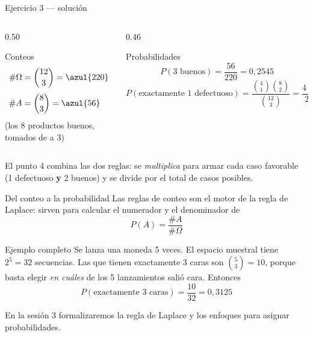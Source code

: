 \documentclass[aspectratio=169,10pt]{beamer}
\begin{document}
\begin{frame}{Ejercicio 3 — solución}
  \begin{columns}[T,onlytextwidth]
    \begin{column}{0.50\textwidth}
      \begin{block}{Conteos}
        \small
        \begin{align*}
          \#\Omega &= \binom{12}{3} = \azul{220}\\[0.3em]
          \#A &= \binom{8}{3} = \azul{56}
        \end{align*}
        \footnotesize
        (los 8 productos buenos, tomados de a 3)
      \end{block}
    \end{column}
    \begin{column}{0.46\textwidth}
      \begin{exampleblock}{Probabilidades}
        \footnotesize
        \[ P(\text{3 buenos})=\frac{56}{220}=0{,}2545 \]
        \[ P(\text{exactamente 1 defectuoso})
           =\frac{\binom{4}{1}\binom{8}{2}}{\binom{12}{3}}
           =\frac{4\cdot 28}{220}=\frac{112}{220}=0{,}5091 \]
      \end{exampleblock}
    \end{column}
  \end{columns}

  \vspace{0.1cm}
  {\footnotesize\color{uniGris} El punto 4 combina las dos reglas: se
  \emph{multiplica} para armar cada caso favorable (1 defectuoso \textbf{y} 2
  buenos) y se divide por el total de casos posibles.}
\end{frame}

\begin{frame}{Del conteo a la probabilidad}
  Las reglas de conteo son el motor de la regla de Laplace: sirven para
  calcular el numerador y el denominador de
  \[ P(A)=\frac{\#A}{\#\Omega} \]

  \vspace{0.2cm}
  \begin{exampleblock}{Ejemplo completo}
    \footnotesize
    Se lanza una moneda 5 veces. El espacio muestral tiene $2^{5}=32$
    secuencias. Las que tienen exactamente 3 caras son
    $\binom{5}{3}=10$, porque basta elegir \emph{en cuáles} de los 5
    lanzamientos salió cara. Entonces
    \[ P(\text{exactamente 3 caras})=\frac{10}{32}=0{,}3125 \]
  \end{exampleblock}

  \vspace{0.1cm}
  {\footnotesize\color{uniGris} En la sesión 3 formalizaremos la regla de
  Laplace y los enfoques para asignar probabilidades.}
\end{frame}
\end{document}
